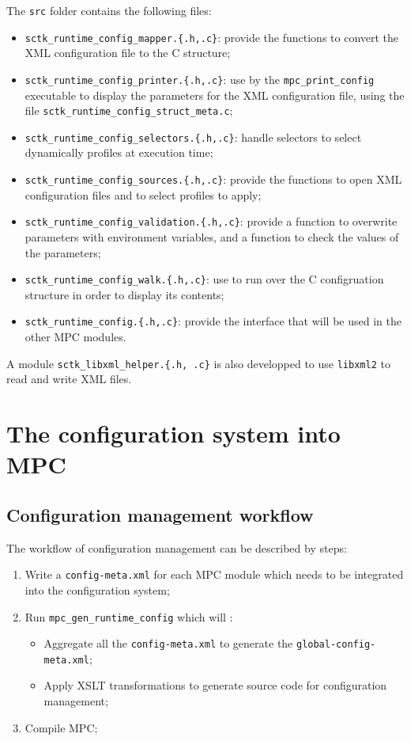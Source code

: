 \documentclass{article}
\begin{document}
The \texttt{src} folder contains the following files:
\begin{itemize}
\item \texttt{sctk\_runtime\_config\_mapper.\{.h,.c\}}: provide the functions to convert the XML configuration file to the C structure;
\item \texttt{sctk\_runtime\_config\_printer.\{.h,.c\}}: use by the \texttt{mpc\_print\_config} executable to display the parameters for the XML configuration file, using the file \texttt{sctk\_runtime\_config\_struct\_meta.c};
\item \texttt{sctk\_runtime\_config\_selectors.\{.h,.c\}}: handle selectors to select dynamically profiles at execution time;
\item \texttt{sctk\_runtime\_config\_sources.\{.h,.c\}}: provide the functions to open XML configuration files and to select profiles to apply;
\item \texttt{sctk\_runtime\_config\_validation.\{.h,.c\}}: provide a function to overwrite parameters with environment variables, and a function to check the values of the parameters;
\item \texttt{sctk\_runtime\_config\_walk.\{.h,.c\}}: use to run over the C configruation structure in order to display its contents;
\item \texttt{sctk\_runtime\_config.\{.h,.c\}}: provide the interface that will be used in the other MPC modules.
\end{itemize}

\noindent A module \texttt{sctk\_libxml\_helper.\{.h, .c\}} is also developped to use \texttt{libxml2} to read and write XML files.

\section{The configuration system into MPC}

\subsection{Configuration management workflow}

The workflow of configuration management can be described by steps:
\begin{enumerate}
\item Write a \texttt{config-meta.xml} for each MPC module which needs to be integrated into the configuration system;
\item Run \texttt{mpc\_gen\_runtime\_config} which will :
\begin{itemize}
\item Aggregate all the \texttt{config-meta.xml} to generate the \texttt{global-config-meta.xml};
\item Apply XSLT transformations to generate source code for configuration management;
\end{itemize}
\item Compile MPC;
\end{enumerate}
\end{document}
